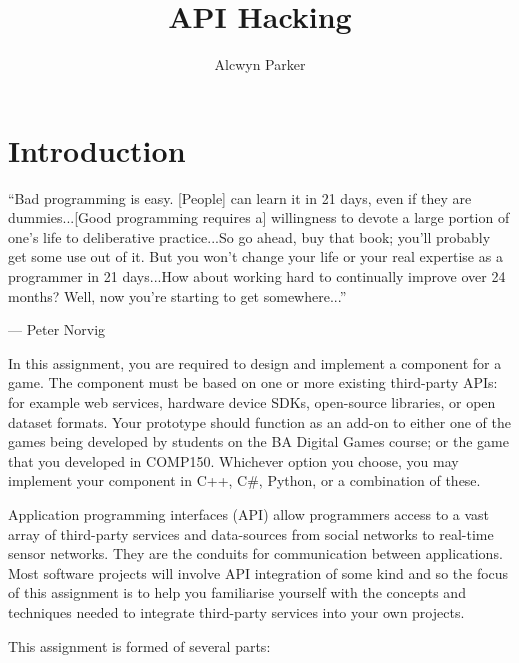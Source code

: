 \documentclass{../fal_assignment}
\title{API Hacking}
\author{Alcwyn Parker}
\begin{document}
\maketitle

\section*{Introduction}

\begin{marginquote}
``Bad programming is easy. [People] can learn it in 21 days, even if they are dummies...[Good programming requires a] willingness to devote a large portion of one's life to deliberative practice...So go ahead, buy that book; you'll probably get some use out of it. But you won't change your life or your real expertise as a programmer in 21 days...How about working hard to continually improve over 24 months? Well, now you're starting to get somewhere...''
\par --- Peter Norvig

\end{marginquote}


In this assignment, you are required to design and implement a component for a game. The component must be based on one or more existing third-party APIs: for example web services, hardware device SDKs, open-source libraries, or open dataset formats. Your prototype should function as an add-on to either one of the games being developed by students on the BA Digital Games course; or the game that you developed in COMP150. Whichever option you choose, you may implement your component in C++, C\#, Python, or a combination of these. 

Application programming interfaces (API) allow programmers access to a vast array of third-party services and data-sources from social networks to real-time sensor networks. They are the conduits for communication between applications. Most software projects will involve API integration of some kind and so the focus of this assignment is to help you familiarise yourself with the concepts and techniques needed to integrate third-party services into your own projects.

This assignment is formed of several parts:
\end{document}

